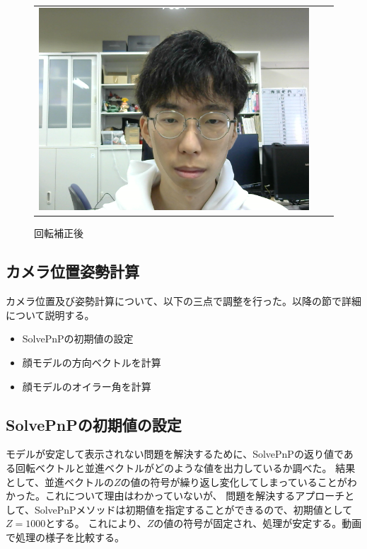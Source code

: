 \documentclass[]{jarticle}          %
\begin{document}
\begin{figure}[!ht]
\begin{tabular}{ccc}
\begin{minipage}[t]{0.3\hsize}
      \caption{回転補正前}
      \label{four}
    \end{minipage}
    \begin{minipage}[t]{0.3\hsize}
      \centering
      \includegraphics[keepaspectratio, scale=0.2]{figures/4.png}
      \caption{回転補正後}
      \label{five}
    \end{minipage}
  \end{tabular}
\end{figure}

\subsection{カメラ位置姿勢計算}
カメラ位置及び姿勢計算について、以下の三点で調整を行った。以降の節で詳細について説明する。
\begin{itemize}
  \item SolvePnPの初期値の設定
  \item 顔モデルの方向ベクトルを計算
  \item 顔モデルのオイラー角を計算
\end{itemize}

\subsection{SolvePnPの初期値の設定}
モデルが安定して表示されない問題を解決するために、SolvePnPの返り値である回転ベクトルと並進ベクトルがどのような値を出力しているか調べた。
結果として、並進ベクトルの$Z$の値の符号が繰り返し変化してしまっていることがわかった。これについて理由はわかっていないが、
問題を解決するアプローチとして、SolvePnPメソッドは初期値を指定することができるので、初期値として$Z=1000$とする。
これにより、$Z$の値の符号が固定され、処理が安定する。動画で処理の様子を比較する。\\
\end{document}
